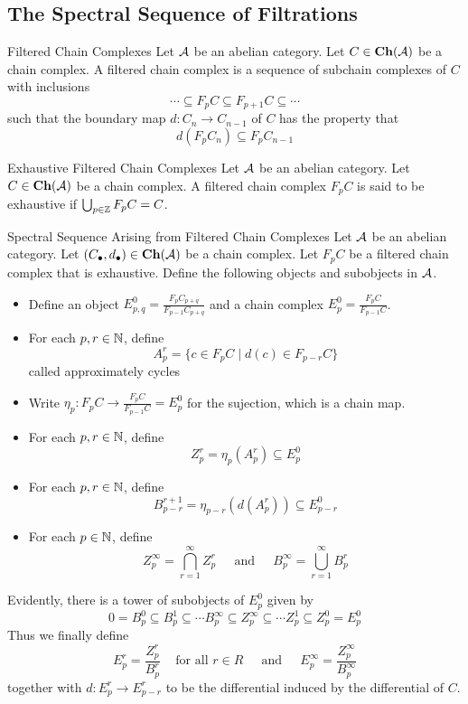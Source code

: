\documentclass[a4paper]{article}
\begin{document}
\subsection{The Spectral Sequence of Filtrations}
\begin{defn}{Filtered Chain Complexes}{} Let $\mathcal{A}$ be an abelian category. Let $C\in\bold{Ch}(\mathcal{A})$ be a chain complex. A filtered chain complex is a sequence of subchain complexes of $C$ with inclusions $$\cdots\subseteq F_pC\subseteq F_{p+1}C\subseteq\cdots$$ such that the boundary map $d:C_n\to C_{n-1}$ of $C$ has the property that $$d(F_pC_n)\subseteq F_pC_{n-1}$$
\end{defn}

\begin{defn}{Exhaustive Filtered Chain Complexes}{} Let $\mathcal{A}$ be an abelian category. Let $C\in\bold{Ch}(\mathcal{A})$ be a chain complex. A filtered chain complex $F_pC$ is said to be exhaustive if $\bigcup_{p\in\mathbb{Z}}F_pC=C$. 
\end{defn}

\begin{defn}{Spectral Sequence Arising from Filtered Chain Complexes}{} Let $\mathcal{A}$ be an abelian category. Let $(C_\bullet,d_\bullet)\in\bold{Ch}(\mathcal{A})$ be a chain complex. Let $F_pC$ be a filtered chain complex that is exhaustive. Define the following objects and subobjects in $\mathcal{A}$. 
\begin{itemize}
\item Define an object $E_{p,q}^0=\frac{F_pC_{p+q}}{F_{p-1}C_{p+q}}$ and a chain complex $E_p^0=\frac{F_pC}{F_{p-1}C}$. 
\item For each $p,r\in\mathbb{N}$, define $$A_p^r=\{c\in F_pC\;|\;d(c)\in F_{p-r}C\}$$ called approximately cycles
\item Write $\eta_p:F_pC\to\frac{F_pC}{F_{p-1}C}=E_p^0$ for the sujection, which is a chain map. 
\item For each $p,r\in\mathbb{N}$, define $$Z_p^r=\eta_p(A_p^r)\subseteq E_p^0$$
\item For each $p,r\in\mathbb{N}$, define $$B_{p-r}^{r+1}=\eta_{p-r}(d(A_p^r))\subseteq E_{p-r}^0$$
\item For each $p\in\mathbb{N}$, define $$Z_p^\infty=\bigcap_{r=1}^\infty Z_p^r\;\;\;\;\text{ and }\;\;\;\; B_p^\infty=\bigcup_{r=1}^\infty B_p^r$$
\end{itemize}
Evidently, there is a tower of subobjects of $E_p^0$ given by $$0=B_p^0\subseteq B_p^1\subseteq\cdots B_p^\infty\subseteq Z_p^\infty\subseteq\cdots Z_p^1\subseteq Z_p^0=E_p^0$$ Thus we finally define $$E_p^r=\frac{Z_p^r}{B_p^r}\;\;\;\text{ for all }r\in R\;\;\;\;\text{ and }\;\;\;\;E_p^\infty=\frac{Z_p^\infty}{B_p^\infty}$$ together with $d:E_p^r\to E_{p-r}^r$ to be the differential induced by the differential of $C$. 
\end{defn}
\end{document}
